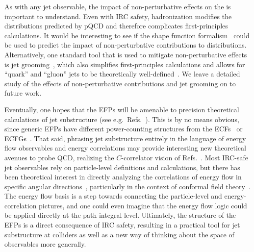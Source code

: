 \documentclass[letterpaper,11pt]{article}
\DeclareRobustCommand{\Refs}[1]{Refs.~\cite{#1}}
\newcommand{\B}{\text{EFP}\xspace}
\newcommand{\Bs}{\text{EFPs}\xspace}
\begin{document}
As with any jet observable, the impact of non-perturbative effects on the \Bs is important to understand.
%
Even with IRC safety, hadronization modifies the distributions predicted by pQCD and therefore complicates first-principles calculations. 
%
It would be interesting to see if the shape function formalism~\cite{Korchemsky:1999kt,Korchemsky:2000kp} could be used to predict the impact of non-perturbative contributions to \B distributions.
%
Alternatively, one standard tool that is used to mitigate non-perturbative effects is jet grooming~\cite{Butterworth:2008iy,Ellis:2009su,Ellis:2009me,Krohn:2009th,Dasgupta:2013ihk,Larkoski:2014wba}, which also simplifies first-principles calculations and allows for ``quark'' and ``gluon'' jets to be theoretically well-defined~\cite{Frye:2016aiz}.
%
We leave a detailed study of the effects of non-perturbative contributions and jet grooming on \Bs to future work.

Eventually, one hopes that the EFPs will be amenable to precision theoretical calculations of jet substructure (see e.g.\ \Refs{Feige:2012vc, Dasgupta:2013ihk,Dasgupta:2013via, Larkoski:2014tva, Procura:2014cba,Larkoski:2015kga,Dasgupta:2015lxh,Frye:2016aiz,Dasgupta:2016ktv,Marzani:2017mva,Larkoski:2017cqq}).
%
This is by no means obvious, since generic EFPs have different power-counting structures from the ECFs~\cite{Larkoski:2013eya} or ECFGs~\cite{Moult:2016cvt}.
%
That said, phrasing jet substructure entirely in the language of energy flow observables and energy correlations may provide interesting new theoretical avenues to probe QCD, realizing the $C$-correlator vision of \Refs{Tkachov:1995kk,Sveshnikov:1995vi,Cherzor:1997ak,Tkachov:1999py}.
%
Most IRC-safe jet observables rely on particle-level definitions and calculations, but there has been theoretical interest in directly analyzing the correlations of energy flow in specific angular directions~\cite{basham1978energy,basham1979energy,Belitsky:2001ij}, particularly in the context of conformal field theory~\cite{Hofman:2008ar,Engelund:2012re,Zhiboedov:2013opa,Belitsky:2013xxa,Belitsky:2013bja}.
%
The energy flow basis is a step towards connecting the particle-level and energy-correlation pictures, and one could even imagine that the energy flow logic could be applied directly at the path integral level.
%
Ultimately, the structure of the EFPs is a direct consequence of IRC safety, resulting in a practical tool for jet substructure at colliders as well as a new way of thinking about the space of observables more generally.
\end{document}
